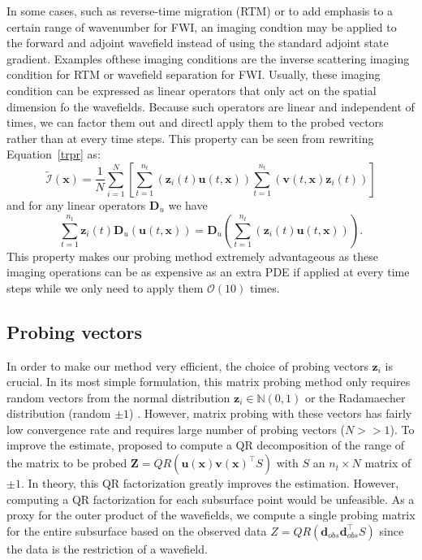 \documentclass[]{segabs}
\begin{document}
In some cases, such as reverse-time migration (RTM) or to add emphasis
to a certain range of wavenumber for FWI, an imaging condtion may be
applied to the forward and adjoint wavefield instead of using the
standard adjoint state gradient. Examples ofthese imaging conditions are
the inverse scattering imaging condition
\citep[\citet{witteisic}]{Whitmore} for RTM or wavefield separation
\citep{Faqi} for FWI. Usually, these imaging condition can be expressed
as linear operators that only act on the spatial dimension fo the
wavefields. Because such operators are linear and independent of times,
we can factor them out and directl apply them to the probed vectors
rather than at every time steps. This property can be seen from
rewriting Equation~\ref{trpr} as:
%
\begin{equation}
    \tilde{\mathcal{I}}(\mathbf{x}) = \frac{1}{N} \sum_{i=1}^{N} \left [ \sum_{t=1}^{n_t} (\mathbf{z}_i(t) \mathbf{u}(t, \mathbf{x})) \sum_{t=1}^{n_t}(\mathbf{v}(t, \mathbf{x}) \mathbf{z}_i(t)) \right ]
\label{trpr_t}
\end{equation}
%
 and for any linear operators $\mathbf{D}_u$ we have
%
\begin{equation}
\sum_{t=1}^{n_t} \mathbf{z}_i(t) \mathbf{D}_u(\mathbf{u}(t, \mathbf{x})) = \mathbf{D}_u(\sum_{t=1}^{n_t} (\mathbf{z}_i(t) \mathbf{u}(t, \mathbf{x}))).
\label{lint}
\end{equation}
%
 This property makes our probing method extremely advantageous as these
imaging operations can be as expensive as an extra PDE if applied at
every time steps while we only need to apply them $\mathcal{O}(10)$
times.

\subsection{Probing vectors}\label{probing-vectors}

In order to make our method very efficient, the choice of probing
vectors $\mathbf{z}_i$ is crucial. In its most simple formulation, this
matrix probing method only requires random vectors from the normal
distribution $\mathbf{z}_i \in \mathbb{N}(0, 1)$ or the Radamaecher
distribution (random $\pm 1$) \citep{Avron}. However, matrix probing
with these vectors has fairly low convergence rate and requires large
number of probing vectors ($N >> 1$). To improve the estimate,
\citep{hutchpp} proposed to compute a QR decomposition of the range of
the matrix to be probed
$\mathbf{Z} = QR(\mathbf{u}(\mathbf{x})\mathbf{v}(\mathbf{x})^\top S)$
with $S$ an $n_t \times N$ matrix of $± 1$. In theory, this QR
factorization greatly improves the estimation. However, computing a QR
factorization for each subsurface point would be unfeasible. As a proxy
for the outer product of the wavefields, we compute a single probing
matrix for the entire subsurface based on the observed data
$Z = QR(\mathbf{d}_{obs}\mathbf{d}_{obs}^\top S)$ since the data is the
restriction of a wavefield.
\end{document}
